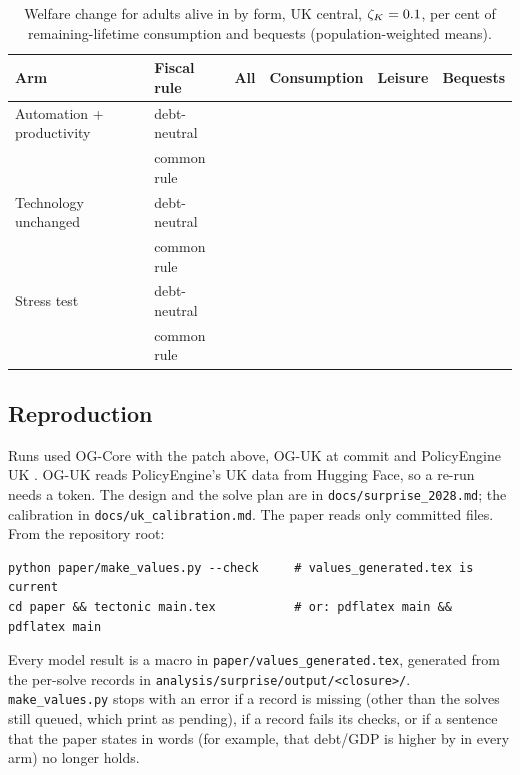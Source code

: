 \begin{table}[h]
\centering
\small
\caption{Welfare change for adults alive in \genShockYear{} by form, UK central, $\zeta_K = 0.1{}$, per cent of remaining-lifetime consumption and bequests (population-weighted means).}
\label{tab:cohort-parts}
\begin{tabular}{llrrrr}
\toprule
Arm & Fiscal rule & All & Consumption & Leisure & Bequests \\
\midrule
Automation + productivity & debt-neutral & \genCohMainDnCentralAvg{} & \genCohMainDnCentralPartCons{} & \genCohMainDnCentralPartLeis{} & \genCohMainDnCentralPartBeq{} \\
 & common rule & \genCohMainCommonCentralAvg{} & \genCohMainCommonCentralPartCons{} & \genCohMainCommonCentralPartLeis{} & \genCohMainCommonCentralPartBeq{} \\
Technology unchanged & debt-neutral & \genCohFlatDnCentralAvg{} & \genCohFlatDnCentralPartCons{} & \genCohFlatDnCentralPartLeis{} & \genCohFlatDnCentralPartBeq{} \\
 & common rule & \genCohFlatCommonCentralAvg{} & \genCohFlatCommonCentralPartCons{} & \genCohFlatCommonCentralPartLeis{} & \genCohFlatCommonCentralPartBeq{} \\
Stress test & debt-neutral & \genCohStressDnCentralAvg{} & \genCohStressDnCentralPartCons{} & \genCohStressDnCentralPartLeis{} & \genCohStressDnCentralPartBeq{} \\
 & common rule & \genCohStressCommonCentralAvg{} & \genCohStressCommonCentralPartCons{} & \genCohStressCommonCentralPartLeis{} & \genCohStressCommonCentralPartBeq{} \\
\bottomrule
\end{tabular}
\end{table}

\subsection{Reproduction}
\label{app:reproduction}

Runs used OG-Core \genOgcoreVersion{} with the patch above, OG-UK at commit \genOgukSha{} and PolicyEngine UK \genPolicyengineUkVersion{}. OG-UK reads PolicyEngine's UK data from Hugging Face, so a re-run needs a token. The design and the solve plan are in \texttt{docs/surprise\_2028.md}; the calibration in \texttt{docs/uk\_calibration.md}. The paper reads only committed files. From the repository root:

\begin{verbatim}
python paper/make_values.py --check     # values_generated.tex is current
cd paper && tectonic main.tex           # or: pdflatex main && pdflatex main
\end{verbatim}

Every model result is a macro in \texttt{paper/values\_generated.tex}, generated from the per-solve records in \texttt{analysis/surprise/output/<closure>/}. \texttt{make\_values.py} stops with an error if a record is missing (other than the solves still queued, which print as pending), if a record fails its checks, or if a sentence that the paper states in words (for example, that debt/GDP is higher by \genDebtRuleYear{} in every arm) no longer holds.
